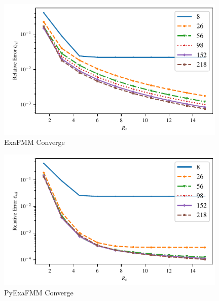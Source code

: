 \documentclass{IEEEcsmag}
\begin{document}
\begin{figure}
\centerline{\includegraphics[width=26pc]{figures/exafmm_multipole_convergence.pdf}}
\caption{ExaFMM Converge}
\end{figure}
\begin{figure}
	\centerline{\includegraphics[width=26pc]{figures/pyexafmm_multipole_convergence.pdf}}
	\caption{PyExaFMM Converge}
	\end{figure}
\end{document}
